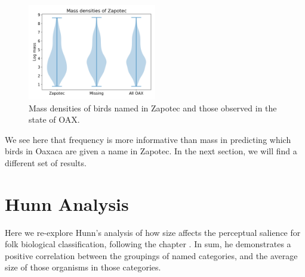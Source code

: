 \documentclass[10pt,letterpaper]{article}
\begin{document}
\begin{figure}[h!]
  \begin{center}
    \includegraphics[width=0.5\textwidth]{./figures/birdmass-violinplots.png}
        \caption{Mass densities of birds named in Zapotec and those observed in the state of OAX.}
        \label{fig-birdmassviolin}
  \end{center}
\end{figure}

We see here that frequency is more informative than mass in predicting which birds in Oaxaca are given a name in Zapotec. In the next section, we will find a different set of results.

\section{Hunn Analysis}
Here we re-explore Hunn's analysis of how size affects the perceptual salience for folk biological classification, following the chapter \cite{hunn1999size}. In sum, he demonstrates a positive correlation between the groupings of named categories, and the average size of those organisms in those categories.
\end{document}

